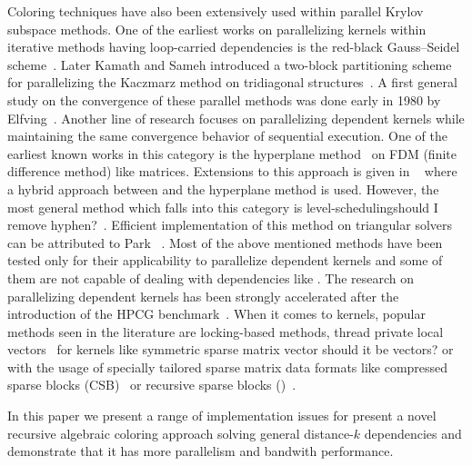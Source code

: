 Coloring techniques have also been extensively used within parallel Krylov subspace methods. One of the earliest works on parallelizing kernels within iterative methods having loop-carried dependencies is the red-black Gauss--Seidel scheme~\cite{RBGS}. Later Kamath and Sameh introduced a two-block partitioning scheme for parallelizing the Kaczmarz method on tridiagonal structures~\cite{Kamath}. A first general study on the convergence of these parallel methods was done early in 1980 by Elfving~\cite{Elfving1980}. Another line of research focuses on parallelizing dependent kernels while maintaining the same convergence behavior of sequential execution. One of the earliest known works in this category is the hyperplane method~\cite{saad} on FDM (finite difference method) like matrices. Extensions to this approach is given in ~\cite{cm-rcm} where a hybrid approach between \MCfull and the hyperplane method is used. However, the most general method which falls into this category is level-scheduling{\CA should I remove hyphen?}~\cite{saad}.  Efficient implementation of this method on triangular solvers can be attributed to Park \etal  ~\cite{park_ls}. Most of the above mentioned methods have been tested only for their applicability to parallelize \DONE dependent kernels and some of them are not capable of dealing with dependencies like \DTWO. The research on parallelizing \DONE dependent kernels has been strongly accelerated after the introduction of the HPCG benchmark~\cite{hpcg}. When it comes to \DTWO kernels, popular methods seen in the literature are locking-based methods, thread private local vectors~\cite{sparseX,thread_private_symm_spmv} for kernels like symmetric sparse matrix vector {\CA should it be vectors?} or with the usage of specially tailored sparse matrix data formats like compressed sparse blocks (CSB)~\cite{CSB} or recursive sparse blocks (\RSB)~\cite{RSB}.


In this paper we present a range of implementation issues for present a novel recursive algebraic coloring approach solving general distance-$k$ dependencies and demonstrate that it has more parallelism and bandwith performance.

